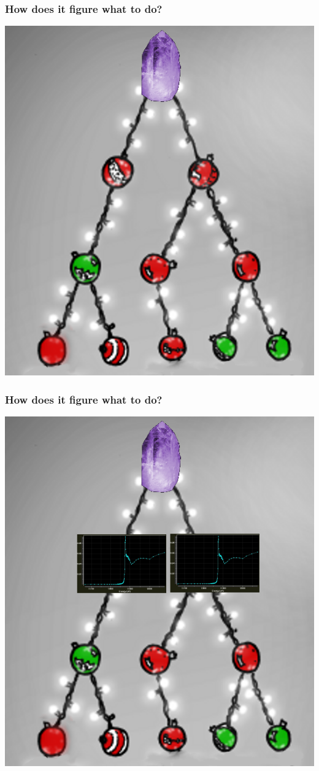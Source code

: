 \documentclass[slides,compress]{beamer}
\begin{document}
\begin{frame}
\frametitle{How does it figure what to do?}
\hspace{4cm}
\includegraphics[scale=0.25]{figures/christmas-tree-nothing-crystal.png}
\end{frame}

\begin{frame}
\frametitle{How does it figure what to do?}
\hspace{4cm}
\includegraphics[scale=0.25]{figures/christmas-tree-nothing-wavelength.png}
\end{frame}
\end{document}
